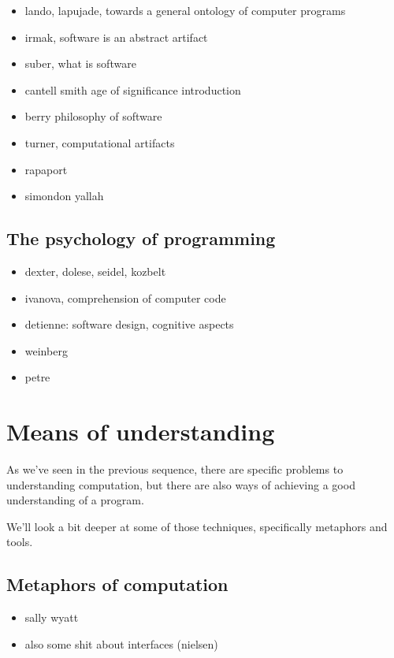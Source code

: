 \begin{itemize}
    \item lando, lapujade, towards a general ontology of computer programs
    \item irmak, software is an abstract artifact
    \item suber, what is software
    \item cantell smith age of significance introduction
    \item berry philosophy of software
    \item turner, computational artifacts
    \item rapaport
    \item simondon yallah
\end{itemize}

\subsection{The psychology of programming}

\begin{itemize}
    \item dexter, dolese, seidel, kozbelt
    \item ivanova, comprehension of computer code
    \item detienne: software design, cognitive aspects
    \item weinberg
    \item petre
\end{itemize}

\section{Means of understanding}

As we've seen in the previous sequence, there are specific problems to understanding computation, but there are also ways of achieving a good understanding of a program.

We'll look a bit deeper at some of those techniques, specifically metaphors and tools.

\subsection{Metaphors of computation}

\begin{itemize}
    \item sally wyatt
    \item also some shit about interfaces (nielsen)
\end{itemize}

